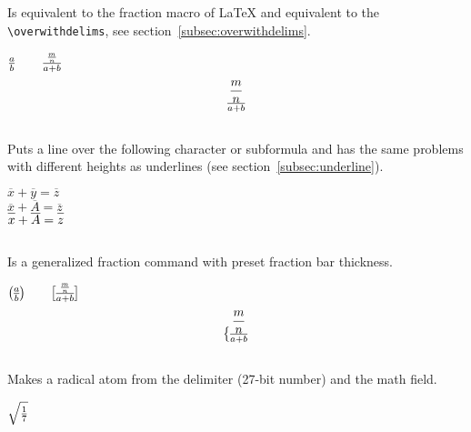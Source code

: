 \begin{table}[htb]
\subsection{}
Is equivalent to the fraction macro of \LaTeX{} and equivalent to the 
\verb+\overwithdelims+, see section~\vref{subsec:overwithdelims}.

\begin{LTXexample}[width=0.2\linewidth]
$ {a\over b} \qquad {{m\over n}\over{a+b}} $
\[ {m\over n}\over{a+b} \]
\end{LTXexample}


\subsection{}
Puts a line over the following character or subformula and has the same problems with different
heights as underlines (see section~\ref{subsec:underline}).

\begin{LTXexample}[width=0.2\linewidth]
$\overline{x}+\overline{y}=\overline{z}$\\
\let\ol\overline
$ \ol{x} + \ol{A} = \ol{z} $\\[5pt]
\def\yPh{\vphantom{A}}
$ \ol{x\yPh} + \ol{A} = \ol{z\yPh} $
\end{LTXexample}

\subsection{}\label{subsec:overwithdelims}
Is a generalized fraction command with preset fraction bar thickness.    %

\begin{LTXexample}[width=0.25\linewidth]
$ {a\overwithdelims() b} \qquad {{m\over n}\overwithdelims[]{a+b}} $
\[ {m\over n}\overwithdelims\{.{a+b} \]
\end{LTXexample}


\subsection{}
Makes a radical atom from the delimiter (27-bit number) and the math field.

\begin{LTXexample}[width=0.2\linewidth]
\def\mySqrt{\radical"0270371\relax}
$ \mySqrt{\frac{1}{7}} $\\[5pt]


\end{LTXexample}
\end{table}
